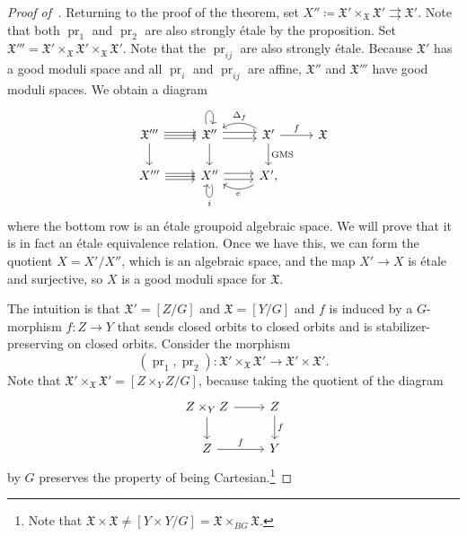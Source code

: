 \documentclass{amsart}
\theoremstyle{definition}
\theoremstyle{remark}
\theoremstyle{plain}
\theoremstyle{definition}
\theoremstyle{remark}
\newcommand{\mf}[1]{\mathfrak{#1}}
\newcommand{\on}[1]{\operatorname{#1}}
\newcommand{\1}{\mathbf{1}}
\newcommand{\2}{\mathbf{2}}
\newcommand{\3}{\mathbf{3}}
\begin{document}
\begin{proof}[Proof of~]
    Returning to the proof of the theorem, set \(X'' \coloneqq \mf{X}' \times_{\mf{X}} \mf{X}' \rightrightarrows \mf{X}'\). Note that both \(\on{pr}_1\) and \(\on{pr}_2\) are also strongly \'etale by the proposition. Set \(\mf{X}''' = \mf{X}' \times_{\mf{X}} \mf{X}' \times_{\mf{X}} \mf{X}'\). Note that the \(\on{pr}_{ij}\) are also strongly \'etale. Because \(\mf{X}'\) has a good moduli space and all \(\on{pr}_i\) and \(\on{pr}_{ij}\) are affine, \(\mf{X}''\) and \(\mf{X}'''\) have good moduli spaces. We obtain a diagram
    \begin{equation*}
    \begin{tikzcd}
        \mf{X}''' \ar{r} \ar[shift left]{r} \ar[shift right]{r} \ar{d} & \mf{X}'' \ar{d} \ar[shift left]{r} \ar[shift right]{r} \ar[loop above]{r} & \mf{X}' \ar{d}{\on{GMS}} \ar{r}{f} \ar[bend right=30]{l}[swap]{\Delta_f} & \mf{X} \\
        X''' \ar{r} \ar[shift left]{r} \ar[shift right]{r} & X'' \ar[shift left]{r} \ar[shift right]{r} \ar[loop below]{r}{i} & X' \ar[bend left=30]{l}{e},
    \end{tikzcd}
    \end{equation*}
    where the bottom row is an \'etale groupoid algebraic space. We will prove that it is in fact an \'etale equivalence relation. Once we have this, we can form the quotient \(X = X' / X''\), which is an algebraic space, and the map \(X' \to X\) is \'etale and surjective, so \(X\) is a good moduli space for \(\mf{X}\).

    The intuition is that \(\mf{X}' = [Z/G]\) and \(\mf{X} = [Y/G]\) and \(f\) is induced by a \(G\)-morphism \(f \colon Z \to Y\) that sends closed orbits to closed orbits and is stabilizer-preserving on closed orbits. Consider the morphism
    \[ (\on{pr}_1, \on{pr}_2) \colon \mf{X}' \times_{\mf{X}} \mf{X}' \to \mf{X}' \times \mf{X}'. \]
    Note that \(\mf{X}' \times_{\mf{X}} \mf{X}' = [Z \times_Y Z / G]\), because taking the quotient of the diagram
    \begin{equation*}
    \begin{tikzcd}
        Z \times_Y Z \ar{r} \ar{d} & Z \ar{d}{f} \\
        Z \ar{r}{f} & Y
    \end{tikzcd}
    \end{equation*}
    by \(G\) preserves the property of being Cartesian.\footnote{Note that \(\mf{X} \times \mf{X} \neq [Y \times Y / G] = \mf{X} \times_{BG} \mf{X}\).}


\end{proof}
\end{document}
